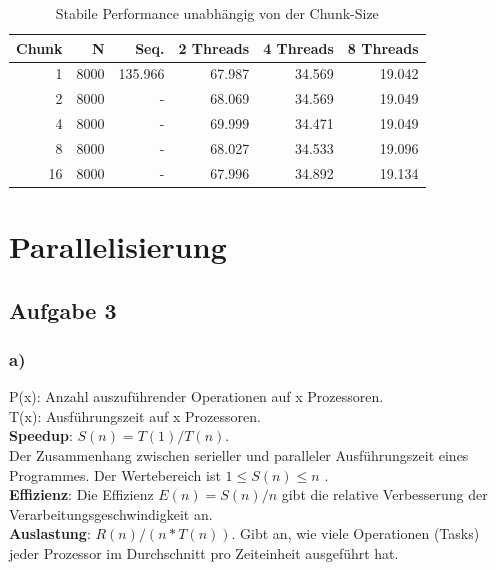 \documentclass{report}
\begin{document}
			\begin{table}
				\begin{tabular}{|r|r|r|r|r|r|}
					\hline
					Chunk & N & Seq. & 2 Threads & 4 Threads & 8 Threads \\
					\hline
					1 & 8000 & 135.966 & 67.987  & 34.569  & 19.042  \\
					\hline
					2 & 8000 & - & 68.069 & 34.569  & 19.049  \\
					\hline
					4 & 8000 & - & 69.999  & 34.471  & 19.049  \\
					\hline
					8 & 8000 & - & 68.027  & 34.533  & 19.096  \\
					\hline
					16 & 8000 & - & 67.996  & 34.892  & 19.134  \\
					\hline
				\end{tabular}
				\caption{Stabile Performance unabhängig von der Chunk-Size}
				\label{Table:2c2}
			\end{table}

\section{Parallelisierung}
    \subsection{Aufgabe 3}
    
        \subsubsection{a)}
        P(x): Anzahl auszuführender Operationen auf x Prozessoren.\\
        T(x): Ausführungszeit auf x Prozessoren.\\
        
        \textbf{Speedup}:  $S(n) = T(1)/T(n) $. \\ Der Zusammenhang zwischen serieller und paralleler Ausführungszeit eines Programmes. Der Wertebereich ist $ 1 \leq S(n) \leq n $ .\\
        
        \textbf{Effizienz}: Die Effizienz $ E(n) = S(n)/n $ gibt die relative Verbesserung der Verarbeitungsgeschwindigkeit an.\\
        
        \textbf{Auslastung}: $ R(n)/(n*T(n)) $. Gibt an, wie viele Operationen (Tasks) jeder Prozessor im Durchschnitt pro Zeiteinheit ausgeführt hat.\\
        
\end{document}
